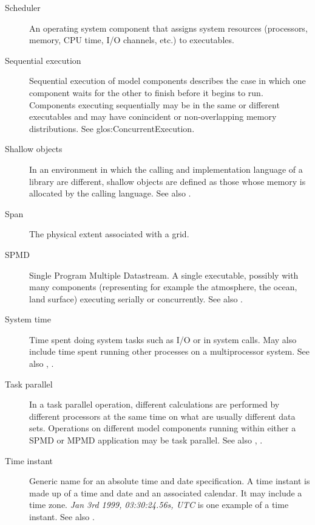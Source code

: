 \begin{description}
\item[Scheduler] \label{glos:Scheduler} An operating system component 
  that assigns system resources (processors, memory, CPU time, 
  I/O channels, etc.) to executables.

\item[Sequential execution] \label{glos:SequentialExecution}
  Sequential execution of model components describes the case in which 
  one component waits for the other to finish before it begins
  to run.  Components executing sequentially may be in the same or 
  different executables and may have conincident or non-overlapping 
  memory distributions.  See 
  {glos:ConcurrentExecution}.

\item[Shallow objects] \label{glos:ShallowObjects} In an environment
  in which the calling and implementation language of a library are
  different, shallow objects are defined as those whose memory is 
  allocated by the calling language. 
  See also .

\item[Span] \label{glos:Span} The physical extent associated with a grid.

\item[SPMD] \label{glos:SPMD} Single Program Multiple Datastream. 
  A single executable, possibly with many components (representing 
  for example the atmosphere, the ocean, land surface) executing 
  serially or concurrently. See also . 

\item [System time] \label{glos:SysTime}Time spent doing system tasks 
  such as I/O or in system calls.  May also include time spent running 
  other processes on a multiprocessor system. See also , .

\item[Task parallel] \label{glos:TaskParallel}  In a task parallel operation,
  different calculations are performed by different processors at the same time
  on what are usually different data sets.  Operations on different model 
  components running within either a SPMD or MPMD application may be task 
  parallel. See also , . 

\item [Time instant] \label{glos:TimeInstant}
  Generic name for an absolute time and date specification. A time instant is made 
  up of a time and date and an associated calendar. It may include a time zone.
  \emph{Jan 3rd 1999, 03:30:24.56s, UTC} is one example of a time instant.
  See also .


\end{description}
